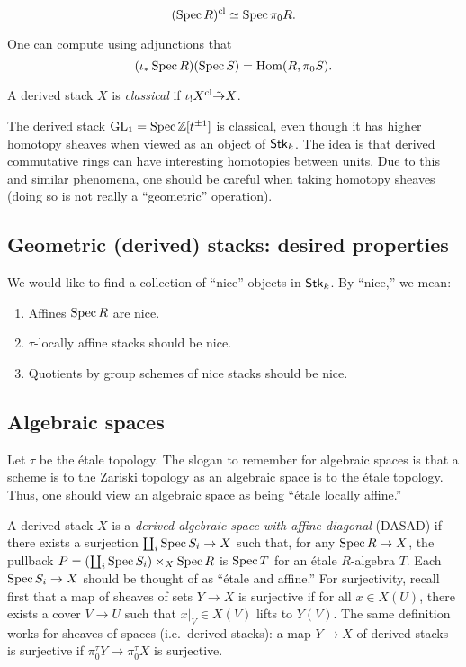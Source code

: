 \documentclass{amsart}
\begin{document}
\begin{ex}
	\[
		(\operatorname{Spec} R)^{\mathrm{cl}} \simeq \operatorname{Spec} \pi_0 R.
	\]
\end{ex}

\begin{ex}
	One can compute using adjunctions that
	\[
		(\iota_* \operatorname{Spec} R)(\operatorname{Spec} S) = \operatorname{Hom}(R, \pi_0 S).
	\]
\end{ex}

\begin{dfn}
	A derived stack $X$ is \emph{classical} if $\iota_! X^{\mathrm{cl}} \tilde{\to} X$.
\end{dfn}

\begin{ex}
	The derived stack $\operatorname{GL}_1 = \operatorname{Spec} \mathbb{Z}[t^{\pm 1}]$ is classical, even though it has higher homotopy sheaves when viewed as an object of $\mathsf{Stk}_k$.
	The idea is that derived commutative rings can have interesting homotopies between units.
	Due to this and similar phenomena, one should be careful when taking homotopy sheaves (doing so is not really a ``geometric'' operation).
\end{ex}

\subsection{Geometric (derived) stacks: desired properties}

We would like to find a collection of ``nice'' objects in $\mathsf{Stk}_k$.
By ``nice,'' we mean:
\begin{enumerate}
	\item Affines $\operatorname{Spec} R$ are nice.
	\item $\tau$-locally affine stacks should be nice.
	\item Quotients by group schemes of nice stacks should be nice.
\end{enumerate}

\subsection{Algebraic spaces}

Let $\tau$ be the \'etale topology.
The slogan to remember for algebraic spaces is that a scheme is to the Zariski topology as an algebraic space is to the \'etale topology.
Thus, one should view an algebraic space as being ``\'etale locally affine.''

\begin{dfn}
	A derived stack $X$ is a \emph{derived algebraic space with affine diagonal} (DASAD) if there exists a surjection $\coprod_i \operatorname{Spec} S_i \to X$ such that, for any $\operatorname{Spec} R \to X$, the pullback $P = (\coprod_i \operatorname{Spec} S_i) \times_X \operatorname{Spec} R$ is $\operatorname{Spec} T$ for an \'etale $R$-algebra $T$.
	Each $\operatorname{Spec} S_i \to X$ should be thought of as ``\'etale and affine.''
	For surjectivity, recall first that a map of sheaves of sets $Y \to X$ is surjective if for all $x \in X(U)$, there exists a cover $V \to U$ such that $x|_V \in X(V)$ lifts to $Y(V)$.
	The same definition works for sheaves of spaces (i.e.\ derived stacks): a map $Y \to X$ of derived stacks is surjective if $\pi_0^\tau Y \to \pi_0^\tau X$ is surjective.
\end{dfn}
\end{document}
